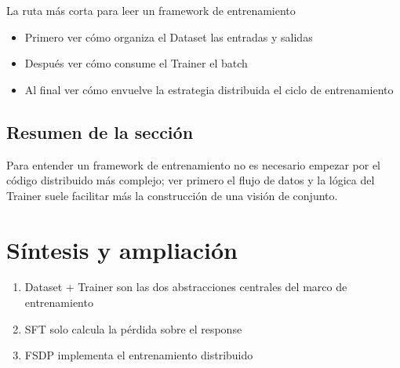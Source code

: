 \documentclass[a4paper]{article}
\begin{document}
\begin{knowledgebox}{La ruta más corta para leer un framework de entrenamiento}
\begin{itemize}
  \item Primero ver cómo organiza el Dataset las entradas y salidas
  \item Después ver cómo consume el Trainer el batch
  \item Al final ver cómo envuelve la estrategia distribuida el ciclo de entrenamiento
\end{itemize}
\end{knowledgebox}

\subsection{Resumen de la sección}
Para entender un framework de entrenamiento no es necesario empezar por el código distribuido más complejo; ver primero el flujo de datos y la lógica del Trainer suele facilitar más la construcción de una visión de conjunto.

\newpage
\section{Síntesis y ampliación}
\begin{enumerate}
  \item Dataset + Trainer son las dos abstracciones centrales del marco de entrenamiento
  \item SFT solo calcula la pérdida sobre el response
  \item FSDP implementa el entrenamiento distribuido
\end{enumerate}
\end{document}
